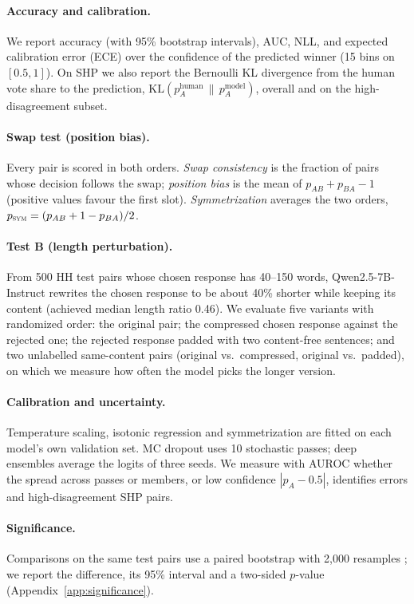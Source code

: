 \documentclass[11pt]{article}
\newcommand{\sym}{\textsc{sym}}
\newcommand{\pa}{p_{A}}
\begin{document}
\paragraph{Accuracy and calibration.} We report accuracy (with 95\% bootstrap intervals), AUC, NLL, and expected calibration error (ECE) over the confidence of the predicted winner (15 bins on $[0.5,1]$). On SHP we also report the Bernoulli KL divergence from the human vote share to the prediction, $\mathrm{KL}(\pa^{\text{human}}\,\|\,\pa^{\text{model}})$, overall and on the high-disagreement subset.

\paragraph{Swap test (position bias).} Every pair is scored in both orders. \emph{Swap consistency} is the fraction of pairs whose decision follows the swap; \emph{position bias} is the mean of $p_{AB}+p_{BA}-1$ (positive values favour the first slot). \emph{Symmetrization} averages the two orders, $p_{\sym}=(p_{AB}+1-p_{BA})/2$.

\paragraph{Test B (length perturbation).} From 500 HH test pairs whose chosen response has 40--150 words, Qwen2.5-7B-Instruct \citep{qwen2024qwen25} rewrites the chosen response to be about 40\% shorter while keeping its content (achieved median length ratio 0.46). We evaluate five variants with randomized order: the original pair; the compressed chosen response against the rejected one; the rejected response padded with two content-free sentences; and two unlabelled same-content pairs (original vs.\ compressed, original vs.\ padded), on which we measure how often the model picks the longer version.

\paragraph{Calibration and uncertainty.} Temperature scaling, isotonic regression and symmetrization are fitted on each model's own validation set. MC dropout uses 10 stochastic passes; deep ensembles average the logits of three seeds. We measure with AUROC whether the spread across passes or members, or low confidence $|\pa-0.5|$, identifies errors and high-disagreement SHP pairs.

\paragraph{Significance.} Comparisons on the same test pairs use a paired bootstrap with 2,000 resamples \citep{efron1994introduction}; we report the difference, its 95\% interval and a two-sided $p$-value (Appendix~\ref{app:significance}).
\end{document}
